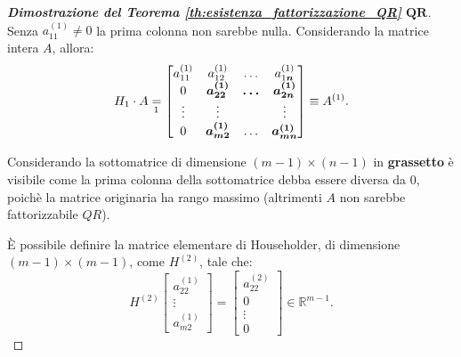 \begin{proof}[\textbf{Dimostrazione del Teorema \ref{th:esistenza_fattorizzazione_QR}} $\boldsymbol{QR}$]
    Senza $a_{11}^{(1)}\neq 0$ la prima colonna non sarebbe nulla. Considerando la matrice intera $A$, allora:
    \begin{equation*}
        H_1\cdot A \underset{\footnotemark}{=} 
        \begin{bmatrix}
            a_{11}^{(1)}& a_{12}^{(1)} &\hdots & a_{1\boldsymbol n}^{(1)}\\
            0 & \boldsymbol{a_{22}^{(1)}} & \boldsymbol\hdots & \boldsymbol{a_{2n}^{(1)}} \\
            \vdots & \boldsymbol{\vdots}  & & \boldsymbol{\vdots}\\
            0 & \boldsymbol{a_{m2}^{(1)}} & \hdots & \boldsymbol{a_{mn}^{(1)}}
        \end{bmatrix}\equiv A^{(1)}.
    \end{equation*}
    
    Considerando la sottomatrice di dimensione $(m-1)\times(n-1)$ in \textbf{grassetto} è visibile come la prima colonna della sottomatrice debba essere diversa da 0, poichè la matrice originaria ha rango massimo (altrimenti $A$ non sarebbe fattorizzabile $QR$).
    
    È possibile definire la matrice elementare di Householder, di dimensione $(m-1)\times(m-1)$, come $H^{(2)}$, tale che:
    \begin{equation*}
        H^{(2)}\begin{bmatrix}
            a_{22}^{(1)}\\
            \vdots\\
            a_{m2}^{(1)}
        \end{bmatrix} = \begin{bmatrix}
            a_{22}^{(2)}\\
            0\\
            \vdots\\
            0
        \end{bmatrix}\in\mathbb R^{m-1}.
    \end{equation*}
    

\end{proof}
